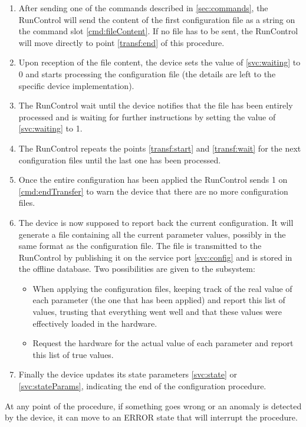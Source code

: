 \documentclass[a4paper]{article}
\begin{document}
\begin{enumerate}
	\item \label{transf:start} After sending one of the commands described in \ref{sec:commands}, the
	RunControl will send the content of the first configuration file as a string on the command slot
	\ref{cmd:fileContent}. If no file has to be sent, the RunControl will move directly to point
	\ref{transf:end} of this procedure.
	\item Upon reception of the file content, the device sets the value of \ref{svc:waiting} to 0 and
	starts processing the configuration file (the details are left to the specific device
	implementation).
	\item \label{transf:wait} The RunControl wait until the device notifies that the file has been
	entirely processed and is waiting for further instructions by setting the value of
	\ref{svc:waiting} to 1.
	\item The RunControl repeats the points \ref{transf:start} and \ref{transf:wait} for the next
	configuration files until the last one has been processed.
	\item \label{transf:end} Once the entire configuration has been applied the RunControl sends 1 on
	\ref{cmd:endTransfer} to warn the device that there are no more configuration files.
	\item The device is now supposed to report back the current configuration. It will generate a file
	containing all the current parameter values, possibly in the same format as the configuration
	file. The file is transmitted to the RunControl by publishing it on the service port
	\ref{svc:config} and is stored in the offline database. Two possibilities are given to the
	subsystem:
	\begin{itemize}
		\item When applying the configuration files, keeping track of the real value of each parameter
		(the one that has been applied) and report this list of values, trusting that everything went
		well and that these values were effectively loaded in the hardware.
		\item Request the hardware for the actual value of each parameter and report this list of true
		values.
	\end{itemize}
	\item Finally the device updates its state parameters \ref{svc:state} or \ref{svc:stateParams},
	indicating the end of the configuration procedure. 
\end{enumerate}
At any point of the procedure, if something goes wrong or an anomaly is detected by the device, it
can move to an ERROR state that will interrupt the procedure. 
\end{document}
